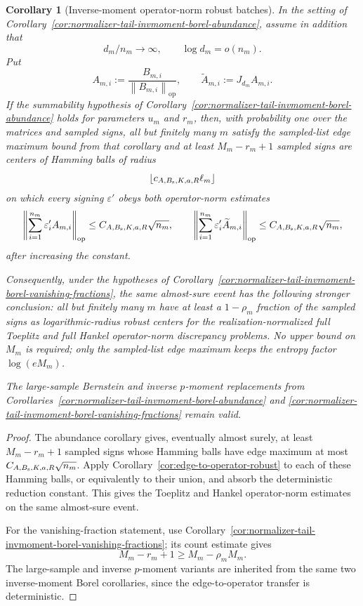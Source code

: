\documentclass[11pt]{amsart}
\numberwithin{equation}{section}
\newtheorem{corollary}[theorem]{Corollary}
\theoremstyle{definition}
\theoremstyle{remark}
\newcommand{\op}{\mathrm{op}}
\newcommand{\norm}[1]{\left\lVert #1\right\rVert}
\newcommand{\eps}{\varepsilon}
\begin{document}
\begin{corollary}[Inverse-moment operator-norm robust batches]
\label{cor:normalizer-tail-invmoment-borel-operator-batches}
In the setting of
Corollary~\ref{cor:normalizer-tail-invmoment-borel-abundance}, assume in
addition that
\[
  d_m/n_m\to\infty,
  \qquad
  \log d_m=o(n_m).
\]
Put
\[
  A_{m,i}:=\frac{B_{m,i}}{\norm{B_{m,i}}_{\op}},
  \qquad
  \widetilde A_{m,i}:=J_{d_m}A_{m,i}.
\]
If the summability hypothesis of
Corollary~\ref{cor:normalizer-tail-invmoment-borel-abundance} holds for
parameters \(u_m\) and \(r_m\), then, with probability one over the matrices and
sampled signs, all but finitely many \(m\) satisfy the sampled-list edge maximum
bound from that corollary and at least \(M_m-r_m+1\) sampled signs are centers
of Hamming balls of radius
\[
  \left\lfloor c_{A,B_{\rm s},K,a,R}\ell_m\right\rfloor
\]
on which every signing \(\eps'\) obeys both operator-norm estimates
\[
  \left\|\sum_{i=1}^{n_m}\eps'_iA_{m,i}\right\|_{\op}
  \le C_{A,B_{\rm s},K,a,R}\sqrt{n_m},
  \qquad
  \left\|\sum_{i=1}^{n_m}\eps'_i\widetilde A_{m,i}\right\|_{\op}
  \le C_{A,B_{\rm s},K,a,R}\sqrt{n_m},
\]
after increasing the constant.

Consequently, under the hypotheses of
Corollary~\ref{cor:normalizer-tail-invmoment-borel-vanishing-fractions}, the
same almost-sure event has the following stronger conclusion: all but finitely
many \(m\) have at least a \(1-\rho_m\) fraction of the sampled signs as
logarithmic-radius robust centers for the realization-normalized full Toeplitz
and full Hankel operator-norm discrepancy problems.  No upper bound on \(M_m\)
is required; only the sampled-list edge maximum keeps the entropy factor
\(\log(eM_m)\).

The large-sample Bernstein and inverse \(p\)-moment replacements from
Corollaries~\ref{cor:normalizer-tail-invmoment-borel-abundance} and
\ref{cor:normalizer-tail-invmoment-borel-vanishing-fractions} remain valid.
\end{corollary}

\begin{proof}
The abundance corollary gives, eventually almost surely, at least
\(M_m-r_m+1\) sampled signs whose Hamming balls have edge maximum at most
\(C_{A,B_{\rm s},K,a,R}\sqrt{n_m}\).  Apply
Corollary~\ref{cor:edge-to-operator-robust} to each of these Hamming balls,
or equivalently to their union, and absorb the deterministic reduction constant.
This gives the Toeplitz and Hankel operator-norm estimates on the same
almost-sure event.

For the vanishing-fraction statement, use
Corollary~\ref{cor:normalizer-tail-invmoment-borel-vanishing-fractions}; its
count estimate gives
\[
  M_m-r_m+1\ge M_m-\rho_mM_m.
\]
The large-sample and inverse \(p\)-moment variants are inherited from the same
two inverse-moment Borel corollaries, since the edge-to-operator transfer is
deterministic.
\end{proof}
\end{document}

